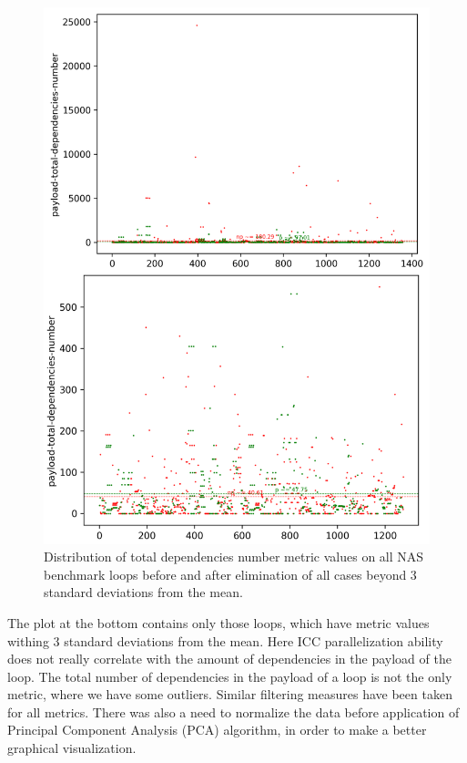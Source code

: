 \begin{figure}[H]
	\centering
	\includegraphics[width=\linewidth]{figs/outliers-filtering.png}
	\caption{Distribution of total dependencies number metric values on all NAS benchmark loops before and after elimination of all cases beyond 3 standard deviations from the mean.}
	\label{outliers-filtering}
\end{figure}  
\qquad The plot at the bottom contains only those loops, which have metric values withing 3 standard deviations from the mean. Here ICC parallelization ability does not really correlate with the amount of dependencies in the payload of the loop.\newline
\null\qquad The total number of dependencies in the payload of a loop is not the only metric, where we have some outliers. Similar filtering measures have been taken for all metrics. There was also a need to normalize the data before application of Principal Component Analysis (PCA) algorithm, in order to make a better graphical visualization.

